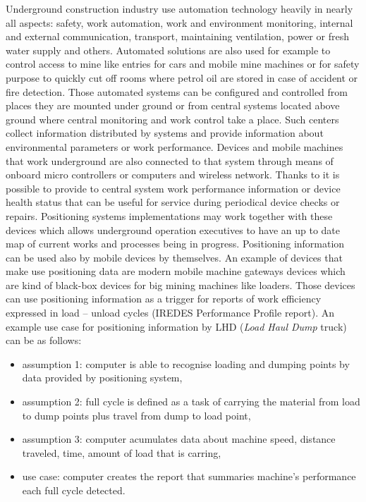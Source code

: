 \documentclass[../main.tex]{subfiles}
\begin{document}
Underground construction industry use automation technology heavily in nearly all aspects: safety, work automation, work and environment monitoring, internal and external communication, transport, maintaining ventilation, power or fresh water supply and others. Automated solutions are also used for example to control access to mine like entries for cars and mobile mine machines or for safety purpose to quickly cut off rooms where petrol oil are stored in case of accident or fire detection. Those automated systems can be configured and controlled from places they are mounted under ground or from central systems located above ground where central monitoring and work control take a place. Such centers collect information distributed by systems and provide information about environmental parameters or work performance. Devices and mobile machines that work underground are also connected to that system through means of onboard micro controllers or computers and wireless network. Thanks to it is possible to provide to central system work performance information or device health status that can be useful for service during periodical device checks or repairs. Positioning systems implementations may work together with these devices which allows underground operation executives to have an up to date map of current works and processes being in progress. Positioning information can be used also by mobile devices by themselves. An example of devices that make use positioning data are modern mobile machine gateways devices \cite{Thesis_CM} which are kind of black-box devices for big mining machines like loaders. Those devices can use positioning information as a trigger for reports of work efficiency expressed in load -- unload cycles (IREDES Performance Profile report)\cite{article_mine_monitoring_architecture}. An example use case for positioning information by LHD (\textit{Load Haul Dump} truck) can be as follows:
\begin{itemize}
	\item assumption 1: computer is able to recognise loading and dumping points by data provided by positioning system,
	\item assumption 2: full cycle is defined as a task of carrying the material from load to dump points plus travel from dump to load point,
	\item assumption 3: computer acumulates data about machine speed, distance traveled, time, amount of load that is carring,
	\item use case: computer creates the report that summaries machine's performance each full cycle detected.
\end{itemize}
\end{document}
